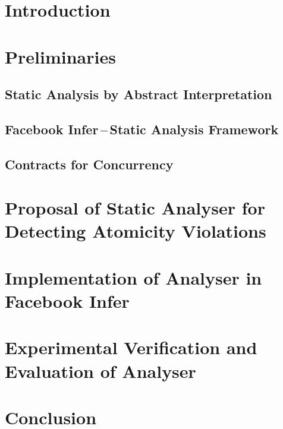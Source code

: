 

\chapter{Introduction}

\cite{Pravidla}



\chapter{Preliminaries}

\section{Static Analysis by Abstract Interpretation}


\section{\texorpdfstring{Facebook Infer\,--\,Static Analysis Framework}{}}


\section{Contracts for Concurrency}



\chapter{Proposal of Static Analyser for Detecting Atomicity Violations}



\chapter{Implementation of Analyser in Facebook Infer}



\chapter{Experimental Verification and Evaluation of Analyser}



\chapter{Conclusion}


